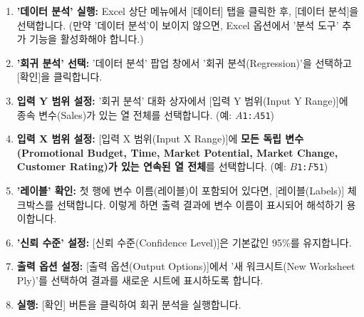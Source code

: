 \documentclass[11pt,a4paper]{book}
\theoremstyle{definition}
\begin{document}
\begin{tcolorbox}[title={\textbf{Excel 데이터 분석 도구 사용하기}}]
\begin{enumerate}
    \item \textbf{'데이터 분석' 실행:} Excel 상단 메뉴에서 [데이터] 탭을 클릭한 후, [데이터 분석]을 선택합니다. (만약 '데이터 분석'이 보이지 않으면, Excel 옵션에서 '분석 도구' 추가 기능을 활성화해야 합니다.)
    \item \textbf{'회귀 분석' 선택:} '데이터 분석' 팝업 창에서 '회귀 분석(Regression)'을 선택하고 [확인]을 클릭합니다.
    \item \textbf{입력 Y 범위 설정:} '회귀 분석' 대화 상자에서 [입력 Y 범위(Input Y Range)]에 종속 변수(Sales)가 있는 열 전체를 선택합니다. (예: \texttt{$A$1:$A$51})
    \item \textbf{입력 X 범위 설정:} [입력 X 범위(Input X Range)]에 \textbf{모든 독립 변수(Promotional Budget, Time, Market Potential, Market Change, Customer Rating)가 있는 연속된 열 전체}를 선택합니다. (예: \texttt{$B$1:$F$51})
    \item \textbf{'레이블' 확인:} 첫 행에 변수 이름(레이블)이 포함되어 있다면, [레이블(Labels)] 체크박스를 선택합니다. 이렇게 하면 출력 결과에 변수 이름이 표시되어 해석하기 용이합니다.
    \item \textbf{'신뢰 수준' 설정:} [신뢰 수준(Confidence Level)]은 기본값인 95\%를 유지합니다.
    \item \textbf{출력 옵션 설정:} [출력 옵션(Output Options)]에서 '새 워크시트(New Worksheet Ply)'를 선택하여 결과를 새로운 시트에 표시하도록 합니다.
    \item \textbf{실행:} [확인] 버튼을 클릭하여 회귀 분석을 실행합니다.
\end{enumerate}
\end{tcolorbox}
\end{document}
